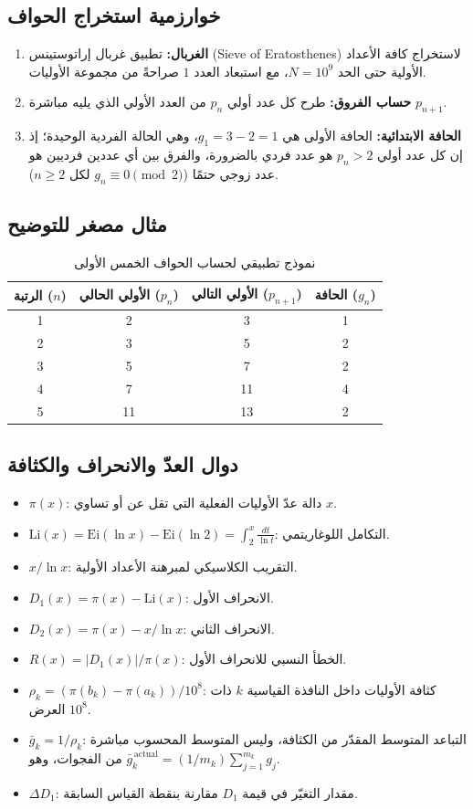 \documentclass[12pt,a4paper]{article}
\begin{document}
\subsection{خوارزمية استخراج الحواف}
\begin{enumerate}
    \item \textbf{الغربال:} تطبيق غربال إراتوستينس (\textenglish{Sieve of Eratosthenes}) لاستخراج كافة الأعداد الأولية حتى الحد $N = 10^9$، مع استبعاد العدد $1$ صراحةً من مجموعة الأوليات.
    \item \textbf{حساب الفروق:} طرح كل عدد أولي $p_n$ من العدد الأولي الذي يليه مباشرة $p_{n+1}$.
    \item \textbf{الحافة الابتدائية:} الحافة الأولى هي $g_1 = 3 - 2 = 1$، وهي الحالة الفردية الوحيدة؛ إذ إن كل عدد أولي $p_n > 2$ هو عدد فردي بالضرورة، والفرق بين أي عددين فرديين هو عدد زوجي حتمًا ($g_n \equiv 0 \pmod 2$ لكل $n \geq 2$).
\end{enumerate}
\subsection{مثال مصغر للتوضيح}
\begin{table}[H]
\centering
\begin{tabular}{cccc}
\toprule
\textbf{الرتبة ($n$)} & \textbf{الأولي الحالي ($p_n$)} & \textbf{الأولي التالي ($p_{n+1}$)} & \textbf{الحافة ($g_n$)} \\
\midrule
1 & 2 & 3 & 1 \\
2 & 3 & 5 & 2 \\
3 & 5 & 7 & 2 \\
4 & 7 & 11 & 4 \\
5 & 11 & 13 & 2 \\
\bottomrule
\end{tabular}
\caption{نموذج تطبيقي لحساب الحواف الخمس الأولى}
\end{table}
\subsection{دوال العدّ والانحراف والكثافة}
\begin{itemize}
    \item $\pi(x)$: دالة عدّ الأوليات الفعلية التي تقل عن أو تساوي $x$.
    \item $\mathrm{Li}(x) = \mathrm{Ei}(\ln x) - \mathrm{Ei}(\ln 2) = \int_2^x \frac{dt}{\ln t}$: التكامل اللوغاريتمي.
    \item $x / \ln x$: التقريب الكلاسيكي لمبرهنة الأعداد الأولية.
    \item $D_1(x) = \pi(x) - \mathrm{Li}(x)$: الانحراف الأول.
    \item $D_2(x) = \pi(x) - x/\ln x$: الانحراف الثاني.
    \item $R(x) = |D_1(x)| / \pi(x)$: الخطأ النسبي للانحراف الأول.
    \item $\rho_k = (\pi(b_k) - \pi(a_k)) / 10^8$: كثافة الأوليات داخل النافذة القياسية $k$ ذات العرض $10^8$.
    \item $\bar{g}_k = 1 / \rho_k$: التباعد المتوسط المقدّر من الكثافة، وليس المتوسط المحسوب مباشرة من الفجوات، وهو $\bar{g}_k^{\,\mathrm{actual}} = (1/m_k)\sum_{j=1}^{m_k} g_j$.
    \item $\Delta D_1$: مقدار التغيّر في قيمة $D_1$ مقارنة بنقطة القياس السابقة.
\end{itemize}
\end{document}
